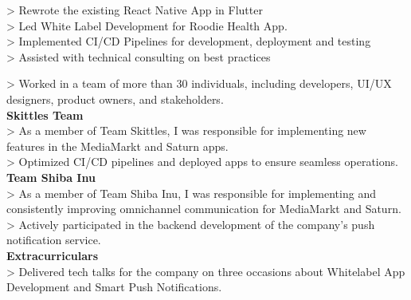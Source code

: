 \documentclass[10pt,a4paper,normalphoto]{altacv}
\begin{document}
\newpage
\begin{fullwidth}
    

> Rewrote the existing React Native App in Flutter\\
> Led White Label Development for Roodie Health App.\\
> Implemented CI/CD Pipelines for development, deployment and testing\\
> Assisted with technical consulting on best practices\\

\vspace{1em}


\vspace{2em}
    
> Worked in a team of more than 30 individuals, including developers, UI/UX designers, product owners, and stakeholders.\\
\vspace{.5em}
\textbf{Skittles Team}\\
> As a member of Team Skittles, I was responsible for implementing new features in the MediaMarkt and Saturn apps.\\
> Optimized CI/CD pipelines and deployed apps to ensure seamless operations.\\
\vspace{.5em}
\textbf{Team Shiba Inu}\\
> As a member of Team Shiba Inu, I was responsible for implementing and consistently improving omnichannel communication for MediaMarkt and Saturn.\\
> Actively participated in the backend development of the company's push notification service.\\
\vspace{.5em}
\textbf{Extracurriculars}\\
> Delivered tech talks for the company on three occasions about Whitelabel App Development and Smart Push Notifications.


\end{fullwidth}
\end{document}
